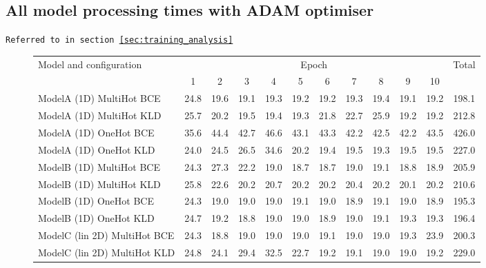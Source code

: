 \begin{appendices}
        \subsection{All model processing times with ADAM optimiser}
        \label{app:model_processing_times}
        \texttt{Referred to in section \ref{sec:training_analysis}}
        
        \begin{figure}[H]
            \centering
            \begin{footnotesize}
                \begin{tabular}{l|c|c|c|c|c|c|c|c|c|c|c|}
                    \multirow{2}{*}{Model and configuration} & \multicolumn{10}{c|}{Epoch} & \multirow{2}{*}{Total}\\
                    \cline{2-11}
                    & 1 & 2 & 3 & 4 & 5 & 6 & 7 & 8 & 9 & 10 &\\
                    \hline
                    ModelA (1D) MultiHot BCE & 24.8 & 19.6 & 19.1 & 19.3 & 19.2 & 19.2 & 19.3 & 19.4 & 19.1 & 19.2 & 198.1\\
                    ModelA (1D) MultiHot KLD & 25.7 & 20.2 & 19.5 & 19.4 & 19.3 & 21.8 & 22.7 & 25.9 & 19.2 & 19.2 & 212.8\\
                    ModelA (1D) OneHot BCE & 35.6 & 44.4 & 42.7 & 46.6 & 43.1 & 43.3 & 42.2 & 42.5 & 42.2 & 43.5 & 426.0\\
                    ModelA (1D) OneHot KLD & 24.0 & 24.5 & 26.5 & 34.6 & 20.2 & 19.4 & 19.5 & 19.3 & 19.5 & 19.5 & 227.0\\
                    ModelB (1D) MultiHot BCE & 24.3 & 27.3 & 22.2 & 19.0 & 18.7 & 18.7 & 19.0 & 19.1 & 18.8 & 18.9 & 205.9\\
                    ModelB (1D) MultiHot KLD & 25.8 & 22.6 & 20.2 & 20.7 & 20.2 & 20.2 & 20.4 & 20.2 & 20.1 & 20.2 & 210.6\\
                    ModelB (1D) OneHot BCE & 24.3 & 19.0 & 19.0 & 19.0 & 19.1 & 19.0 & 18.9 & 19.1 & 19.0 & 18.9 & 195.3\\
                    ModelB (1D) OneHot KLD & 24.7 & 19.2 & 18.8 & 19.0 & 19.0 & 18.9 & 19.0 & 19.1 & 19.3 & 19.3 & 196.4\\
                    ModelC (lin 2D) MultiHot BCE & 24.3 & 18.8 & 19.0 & 19.0 & 19.0 & 19.1 & 19.0 & 19.0 & 19.3 & 23.9 & 200.3\\
                    ModelC (lin 2D) MultiHot KLD & 24.8 & 24.1 & 29.4 & 32.5 & 22.7 & 19.2 & 19.1 & 19.0 & 19.0 & 19.2 & 229.0\\

\end{tabular}
\end{footnotesize}
\end{figure}
\end{appendices}
